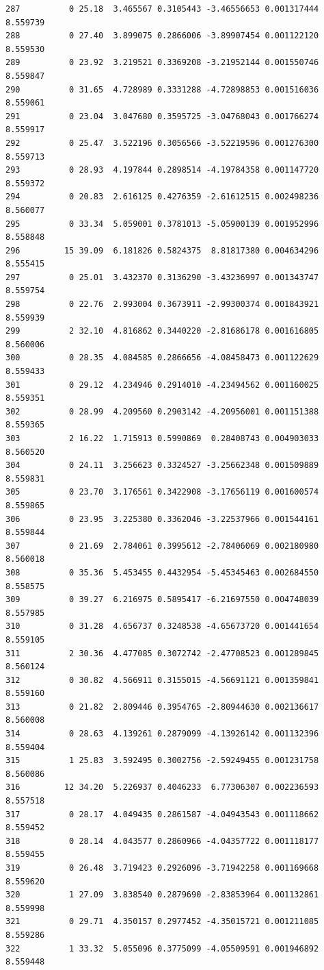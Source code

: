 \documentclass[]{book}
\theoremstyle{definition}
\theoremstyle{definition}
\theoremstyle{definition}
\theoremstyle{remark}
\begin{document}
\begin{verbatim}
287          0 25.18  3.465567 0.3105443 -3.46556653 0.001317444 8.559739
288          0 27.40  3.899075 0.2866006 -3.89907454 0.001122120 8.559530
289          0 23.92  3.219521 0.3369208 -3.21952144 0.001550746 8.559847
290          0 31.65  4.728989 0.3331288 -4.72898853 0.001516036 8.559061
291          0 23.04  3.047680 0.3595725 -3.04768043 0.001766274 8.559917
292          0 25.47  3.522196 0.3056566 -3.52219596 0.001276300 8.559713
293          0 28.93  4.197844 0.2898514 -4.19784358 0.001147720 8.559372
294          0 20.83  2.616125 0.4276359 -2.61612515 0.002498236 8.560077
295          0 33.34  5.059001 0.3781013 -5.05900139 0.001952996 8.558848
296         15 39.09  6.181826 0.5824375  8.81817380 0.004634296 8.555415
297          0 25.01  3.432370 0.3136290 -3.43236997 0.001343747 8.559754
298          0 22.76  2.993004 0.3673911 -2.99300374 0.001843921 8.559939
299          2 32.10  4.816862 0.3440220 -2.81686178 0.001616805 8.560006
300          0 28.35  4.084585 0.2866656 -4.08458473 0.001122629 8.559433
301          0 29.12  4.234946 0.2914010 -4.23494562 0.001160025 8.559351
302          0 28.99  4.209560 0.2903142 -4.20956001 0.001151388 8.559365
303          2 16.22  1.715913 0.5990869  0.28408743 0.004903033 8.560520
304          0 24.11  3.256623 0.3324527 -3.25662348 0.001509889 8.559831
305          0 23.70  3.176561 0.3422908 -3.17656119 0.001600574 8.559865
306          0 23.95  3.225380 0.3362046 -3.22537966 0.001544161 8.559844
307          0 21.69  2.784061 0.3995612 -2.78406069 0.002180980 8.560018
308          0 35.36  5.453455 0.4432954 -5.45345463 0.002684550 8.558575
309          0 39.27  6.216975 0.5895417 -6.21697550 0.004748039 8.557985
310          0 31.28  4.656737 0.3248538 -4.65673720 0.001441654 8.559105
311          2 30.36  4.477085 0.3072742 -2.47708523 0.001289845 8.560124
312          0 30.82  4.566911 0.3155015 -4.56691121 0.001359841 8.559160
313          0 21.82  2.809446 0.3954765 -2.80944630 0.002136617 8.560008
314          0 28.63  4.139261 0.2879099 -4.13926142 0.001132396 8.559404
315          1 25.83  3.592495 0.3002756 -2.59249455 0.001231758 8.560086
316         12 34.20  5.226937 0.4046233  6.77306307 0.002236593 8.557518
317          0 28.17  4.049435 0.2861587 -4.04943543 0.001118662 8.559452
318          0 28.14  4.043577 0.2860966 -4.04357722 0.001118177 8.559455
319          0 26.48  3.719423 0.2926096 -3.71942258 0.001169668 8.559620
320          1 27.09  3.838540 0.2879690 -2.83853964 0.001132861 8.559998
321          0 29.71  4.350157 0.2977452 -4.35015721 0.001211085 8.559286
322          1 33.32  5.055096 0.3775099 -4.05509591 0.001946892 8.559448

\end{verbatim}
\end{document}
